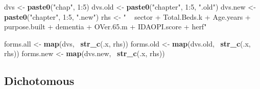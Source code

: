 \documentclass[]{article}
\newenvironment{Shaded}{\begin{snugshade}}{\end{snugshade}}
\newcommand{\KeywordTok}[1]{\textcolor[rgb]{0.13,0.29,0.53}{\textbf{{#1}}}}
\newcommand{\DataTypeTok}[1]{\textcolor[rgb]{0.13,0.29,0.53}{{#1}}}
\newcommand{\DecValTok}[1]{\textcolor[rgb]{0.00,0.00,0.81}{{#1}}}
\newcommand{\StringTok}[1]{\textcolor[rgb]{0.31,0.60,0.02}{{#1}}}
\newcommand{\OtherTok}[1]{\textcolor[rgb]{0.56,0.35,0.01}{{#1}}}
\newcommand{\NormalTok}[1]{{#1}}
\begin{document}
\begin{Shaded}
\begin{Highlighting}[]
\NormalTok{dvs <-}\StringTok{ }\KeywordTok{paste0}\NormalTok{(}\StringTok{"chap"}\NormalTok{, }\DecValTok{1}\NormalTok{:}\DecValTok{5}\NormalTok{)}
\NormalTok{dvs.old <-}\StringTok{ }\KeywordTok{paste0}\NormalTok{(}\StringTok{"chapter"}\NormalTok{, }\DecValTok{1}\NormalTok{:}\DecValTok{5}\NormalTok{, }\StringTok{".old"}\NormalTok{)}
\NormalTok{dvs.new <-}\StringTok{ }\KeywordTok{paste0}\NormalTok{(}\StringTok{"chapter"}\NormalTok{, }\DecValTok{1}\NormalTok{:}\DecValTok{5}\NormalTok{, }\StringTok{".new"}\NormalTok{)}
\NormalTok{rhs <-}\StringTok{ " ~ sector + Total.Beds.k + Age.years + purpose.built  + dementia  + OVer.65.m + IDAOPI.score + herf"}

\NormalTok{forms.all <-}\StringTok{ }\KeywordTok{map}\NormalTok{(dvs, ~}\KeywordTok{str_c}\NormalTok{(.x, rhs))}
\NormalTok{forms.old <-}\StringTok{ }\KeywordTok{map}\NormalTok{(dvs.old, ~}\KeywordTok{str_c}\NormalTok{(.x, rhs))}
\NormalTok{forms.new <-}\StringTok{ }\KeywordTok{map}\NormalTok{(dvs.new, ~}\KeywordTok{str_c}\NormalTok{(.x, rhs))}
\end{Highlighting}
\end{Shaded}

\subsection{Dichotomous}\label{dichotomous-1}

\begin{Shaded}
\end{Shaded}
\end{document}
